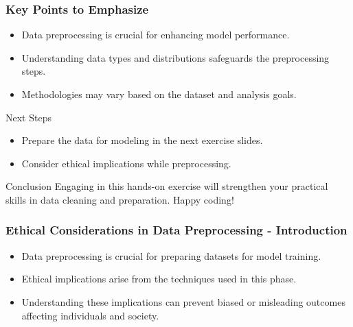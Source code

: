 \documentclass[aspectratio=169]{beamer}
\begin{document}
\begin{frame}[fragile]
    \frametitle{Key Points to Emphasize}
    \begin{itemize}
        \item Data preprocessing is crucial for enhancing model performance.
        \item Understanding data types and distributions safeguards the preprocessing steps.
        \item Methodologies may vary based on the dataset and analysis goals.
    \end{itemize}
    
    \begin{block}{Next Steps}
        \begin{itemize}
            \item Prepare the data for modeling in the next exercise slides.
            \item Consider ethical implications while preprocessing.
        \end{itemize}
    \end{block}

    \begin{block}{Conclusion}
        Engaging in this hands-on exercise will strengthen your practical skills in data cleaning and preparation. Happy coding!
    \end{block}
\end{frame}

\begin{frame}[fragile]
    \frametitle{Ethical Considerations in Data Preprocessing - Introduction}
    \begin{itemize}
        \item Data preprocessing is crucial for preparing datasets for model training.
        \item Ethical implications arise from the techniques used in this phase.
        \item Understanding these implications can prevent biased or misleading outcomes affecting individuals and society.
    \end{itemize}
\end{frame}
\end{document}
